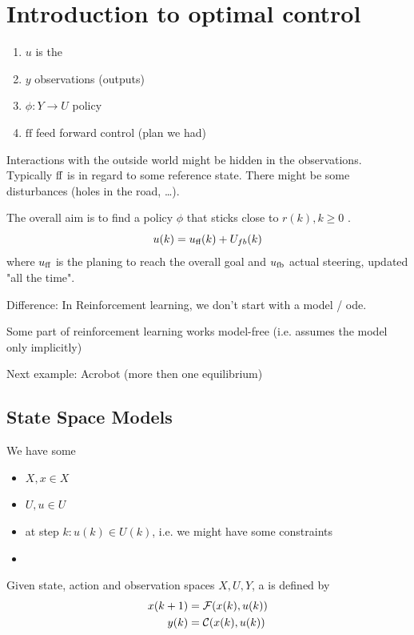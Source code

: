 \chapter{Introduction to optimal control}

\begin{enumerate}
    \item $u$ is the  
    \item $y$ observations (outputs)
    \item $\phi:Y\to U$ policy
    \item $\text{ff}$ feed forward control (plan we had)
\end{enumerate}

Interactions with the outside world might be hidden in the observations. Typically ${\text{ff}}$ is 
in regard to some reference state. There might be some disturbances (holes in the road, \dots).

The overall aim is to find a policy \(\phi\) that sticks close to $r(k),k\geq 0$ .
\[u(k)=u_{\text{ff}}(k)+U_{fb}(k)\]
where $u_{\text{ff}}$ is the planing to reach the overall goal and $u_{{\text{fb}}}$ actual steering, updated "all the time".


Difference: In Reinforcement learning, we don't start with a model / ode. 

Some part of reinforcement learning works model-free (i.e. assumes the model only implicitly)


Next example: Acrobot (more then one equilibrium)

\section{State Space Models}

We have some

\begin{itemize}
    \item {} \(X,x\in X\)
    \item {} \(U, u\in U\)
    \item {} at step \(k: u(k)\in U(k)\), i.e. we might have some constraints
    \item {}
\end{itemize}

\begin{definition}\label{def:1.1} 
    Given state, action and observation spaces \(X,U,Y\), a 
    is defined by
    \begin{align}\label{eq:1}
        x(k+1)&=\mathcal{F}(x(k),u(k))\\
        y(k)&=\mathcal{C}(x(k),u(k))  
    \end{align}
\end{definition}


